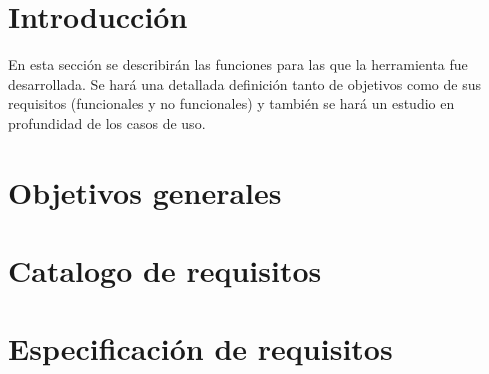 
\section{Introducción}

En esta sección se describirán las funciones para las que la herramienta fue desarrollada. Se hará una detallada definición tanto de objetivos como de sus requisitos (funcionales y no funcionales) y también se hará un estudio en profundidad de los casos de uso.

\section{Objetivos generales}

\section{Catalogo de requisitos}

\section{Especificación de requisitos}



